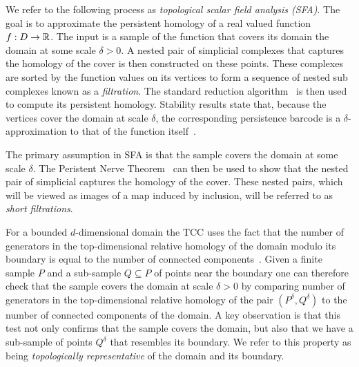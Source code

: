 
We refer to the following process as \emph{topological scalar field analysis (SFA)}.
The goal is to approximate the persistent homology of a real valued function $f : D\to \mathbb{R}$.
The input is a sample of the function that covers its domain the domain at some scale $\delta > 0$.
A nested pair of simplicial complexes that captures the homology of the cover is then constructed on these points.
These complexes are sorted by the function values on its vertices to form a sequence of nested sub complexes known as a \emph{filtration}.
The standard reduction algorithm~\cite{edelsbrunner02simplification,zomorodian05computing} is then used to compute its persistent homology.
Stability results state that, because the vertices cover the domain at scale $\delta$, the corresponding persistence barcode is a $\delta$-approximation to that of the function itself~\cite{cohensteiner07stability,chazal09proximity}.

The primary assumption in SFA is that the sample covers the domain at some scale $\delta$.
The Peristent Nerve Theorem~\cite{chazal08towards} can then be used to show that the nested pair of simplicial captures the homology of the cover.
These nested pairs, which will be viewed as images of a map induced by inclusion, will be referred to as \emph{short filtrations}.

For a bounded $d$-dimensional domain the TCC uses the fact that the number of generators in the top-dimensional relative homology of the domain modulo its boundary is equal to the number of connected components~\cite{desilva07coverage}.
Given a finite sample $P$ and a sub-sample $Q\subseteq P$ of points near the boundary one can therefore check that the sample covers the domain at scale $\delta > 0$ by comparing number of generators in the top-dimensional relative homology of the pair $(P^\delta, Q^\delta)$ to the number of connected components of the domain.
A key observation is that this test not only confirms that the sample covers the domain, but also that we have a sub-sample of points $Q^\delta$ that resembles its boundary.
We refer to this property as being \emph{topologically representative} of the domain and its boundary.

